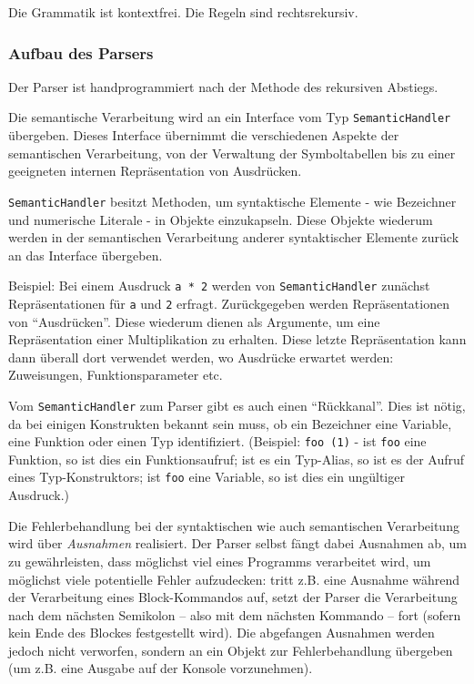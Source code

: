 \documentclass[twoside,a4paper,fleqn,12pt]{article}
\begin{document}
Die Grammatik ist kontextfrei. Die Regeln sind rechtsrekursiv.

\subsubsection{Aufbau des Parsers}

Der Parser ist handprogrammiert nach der Methode des rekursiven Abstiegs. %

Die semantische Verarbeitung wird an ein Interface vom Typ \verb+SemanticHandler+ übergeben.
Dieses Interface übernimmt die verschiedenen Aspekte der semantischen Verarbeitung, von der Verwaltung der
Symboltabellen bis zu einer geeigneten internen Repräsentation von Ausdrücken.

\verb+SemanticHandler+ besitzt Methoden, um syntaktische Elemente - wie Bezeichner und numerische Literale - in Objekte 
einzukapseln. Diese Objekte wiederum werden in der semantischen Verarbeitung anderer syntaktischer Elemente
zurück an das Interface übergeben.

Beispiel: Bei einem Ausdruck \verb+a * 2+ werden von \verb+SemanticHandler+ zunächst Repräsentationen für
\verb+a+ und \verb+2+ erfragt. Zurückgegeben werden Repräsentationen von "`Ausdrücken"'. Diese wiederum
dienen als Argumente, um eine Repräsentation einer Multiplikation zu erhalten. Diese letzte Repräsentation kann
dann überall dort verwendet werden, wo Ausdrücke erwartet werden: Zuweisungen, Funktionsparameter etc.

Vom \verb+SemanticHandler+ zum Parser gibt es auch einen "`Rückkanal"'. Dies ist nötig, da bei einigen
Konstrukten bekannt sein muss, ob ein Bezeichner eine Variable, eine Funktion oder einen Typ identifiziert.
(Beispiel: \verb+foo (1)+ - ist \verb+foo+ eine Funktion, so ist dies ein Funktionsaufruf; ist es ein Typ-Alias, so ist es
der Aufruf eines Typ-Konstruktors; ist \verb+foo+ eine Variable, so ist dies ein ungültiger Ausdruck.)

Die Fehlerbehandlung bei der syntaktischen wie auch semantischen Verarbeitung wird über \emph{Ausnahmen}
realisiert. Der Parser selbst fängt dabei Ausnahmen ab, um zu gewährleisten, dass möglichst viel eines
Programms verarbeitet wird, um möglichst viele potentielle Fehler aufzudecken: %
tritt z.B. eine Ausnahme während der Verarbeitung eines Block-Kommandos auf, setzt der Parser die
Verarbeitung nach dem nächsten Semikolon -- also mit dem nächsten Kommando -- fort (sofern kein Ende
des Blockes festgestellt wird).
Die abgefangen Ausnahmen werden jedoch nicht verworfen, sondern an ein Objekt zur Fehlerbehandlung
übergeben (um z.B. eine Ausgabe auf der Konsole vorzunehmen).
\end{document}
